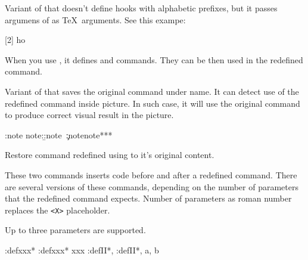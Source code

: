 Variant of  that doesn't define hooks with 
alphabetic prefixes, but it passes argumens of 
as \TeX\ arguments. See this exampe:

\begin{texsource}
[2]{\def\hookI{#1}\def\hookII{#2}}
\def\try#1{\hookI#1\hookII}
\try{ho} 
\end{texsource}

When you use , it defines  and 
commands. They can be then used in the redefined  command.


Variant of  that saves the original command under  name.
It can detect use of the redefined command inside picture. In such case, it will use
the original command to produce correct visual result in the picture.

\begin{texsource}
\def\:tempa#1{\a:note note:\b:note~#1\c:note}
\HLet\note\:tempa
\Configure{note}{*}{*}{*}
\end{texsource}


Restore command redefined using  to it's original content.



These two commands inserts code before and after a redefined command. There are several
versions of these commands, depending on the number of parameters that the redefined 
command expects. Number of parameters as roman number replaces the \verb|<X>| placeholder. 

Up to three parameters are supported.


\begin{texsource}
\newcommand\bar{xxx}
\pend:def\bar{*}
\append:def\bar{*}
\bar
\newcommand\foo[2]{#1, #2}
\pend:defII\foo{*}
\append:defII\foo{*}
\foo{a}{b}

\end{texsource}


